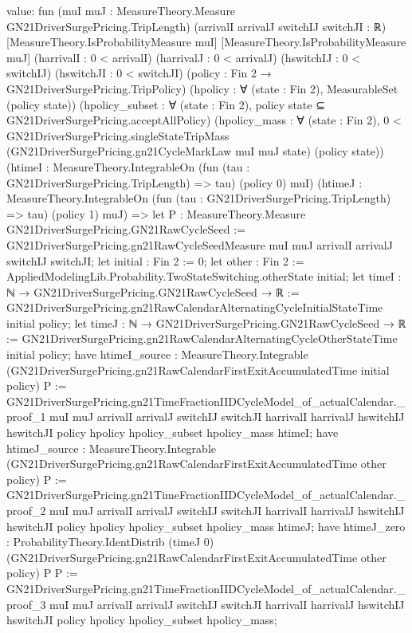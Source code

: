 \documentclass[10pt]{article}
\begin{document}
\begin{ReviewVerbatim}
value:
fun (muI muJ : MeasureTheory.Measure GN21DriverSurgePricing.TripLength) (arrivalI arrivalJ switchIJ switchJI : ℝ)
    [MeasureTheory.IsProbabilityMeasure muI] [MeasureTheory.IsProbabilityMeasure muJ] (harrivalI : 0 < arrivalI)
    (harrivalJ : 0 < arrivalJ) (hswitchIJ : 0 < switchIJ) (hswitchJI : 0 < switchJI)
    (policy : Fin 2 → GN21DriverSurgePricing.TripPolicy) (hpolicy : ∀ (state : Fin 2), MeasurableSet (policy state))
    (hpolicy_subset : ∀ (state : Fin 2), policy state ⊆ GN21DriverSurgePricing.acceptAllPolicy)
    (hpolicy_mass :
      ∀ (state : Fin 2),
        0 <
          GN21DriverSurgePricing.singleStateTripMass (GN21DriverSurgePricing.gn21CycleMarkLaw muI muJ state)
            (policy state))
    (htimeI : MeasureTheory.IntegrableOn (fun (tau : GN21DriverSurgePricing.TripLength) => tau) (policy 0) muI)
    (htimeJ : MeasureTheory.IntegrableOn (fun (tau : GN21DriverSurgePricing.TripLength) => tau) (policy 1) muJ) =>
  let P : MeasureTheory.Measure GN21DriverSurgePricing.GN21RawCycleSeed :=
    GN21DriverSurgePricing.gn21RawCycleSeedMeasure muI muJ arrivalI arrivalJ switchIJ switchJI;
  let initial : Fin 2 := 0;
  let other : Fin 2 := AppliedModelingLib.Probability.TwoStateSwitching.otherState initial;
  let timeI : ℕ → GN21DriverSurgePricing.GN21RawCycleSeed → ℝ :=
    GN21DriverSurgePricing.gn21RawCalendarAlternatingCycleInitialStateTime initial policy;
  let timeJ : ℕ → GN21DriverSurgePricing.GN21RawCycleSeed → ℝ :=
    GN21DriverSurgePricing.gn21RawCalendarAlternatingCycleOtherStateTime initial policy;
  have htimeI_source :
    MeasureTheory.Integrable (GN21DriverSurgePricing.gn21RawCalendarFirstExitAccumulatedTime initial policy) P :=
    GN21DriverSurgePricing.gn21TimeFractionIIDCycleModel_of_actualCalendar._proof_1 muI muJ arrivalI arrivalJ switchIJ
      switchJI harrivalI harrivalJ hswitchIJ hswitchJI policy hpolicy hpolicy_subset hpolicy_mass htimeI;
  have htimeJ_source :
    MeasureTheory.Integrable (GN21DriverSurgePricing.gn21RawCalendarFirstExitAccumulatedTime other policy) P :=
    GN21DriverSurgePricing.gn21TimeFractionIIDCycleModel_of_actualCalendar._proof_2 muI muJ arrivalI arrivalJ switchIJ
      switchJI harrivalI harrivalJ hswitchIJ hswitchJI policy hpolicy hpolicy_subset hpolicy_mass htimeJ;
  have htimeJ_zero :
    ProbabilityTheory.IdentDistrib (timeJ 0)
      (GN21DriverSurgePricing.gn21RawCalendarFirstExitAccumulatedTime other policy) P P :=
    GN21DriverSurgePricing.gn21TimeFractionIIDCycleModel_of_actualCalendar._proof_3 muI muJ arrivalI arrivalJ switchIJ
      switchJI harrivalI harrivalJ hswitchIJ hswitchJI policy hpolicy hpolicy_subset hpolicy_mass;

\end{ReviewVerbatim}
\end{document}
